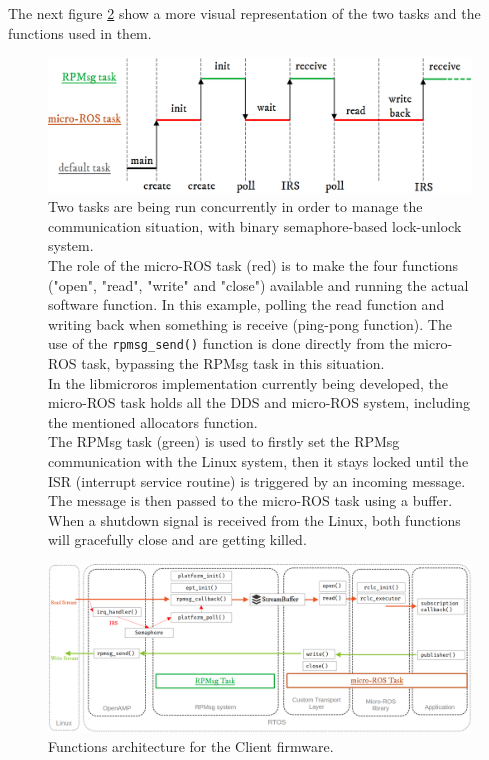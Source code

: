 \documentclass[10pt]{article}
\begin{document}
The next figure \ref{fig:org9400d2f} show a more visual representation of the two tasks and the
functions used in them.

\begin{figure}[htbp]
\centering
\includegraphics[width=.9\textwidth]{./img/tasks.png}
\caption{\label{fig:org5972a4b}Two tasks are being run concurrently in order to manage the communication situation, with binary semaphore-based lock-unlock system.\\[0pt]
 The role of the micro-ROS task (red) is to make the four functions ("open", "read", "write" and "close")  available and running the actual software function. In this example, polling the read function and writing back when something is receive (ping-pong function). The use of the \texttt{rpmsg\_send()} function is done directly from the micro-ROS task, bypassing the RPMsg task in this situation.\\[0pt]
 In the libmicroros implementation currently being developed, the micro-ROS task holds all the DDS and micro-ROS system, including the mentioned allocators function.\\[0pt]
 The RPMsg task (green) is used to firstly set the RPMsg communication with the Linux system, then it stays locked until the ISR (interrupt service routine) is triggered by an incoming message. The message is then passed to the micro-ROS task using a buffer.\\[0pt]
 When a shutdown signal is received from the Linux, both functions will gracefully close and are getting killed.}
\end{figure}

\begin{figure}[htbp]
\centering
\includegraphics[width=.9\textwidth]{./img/client_arch.png}
\caption{\label{fig:org9400d2f}Functions architecture for the Client firmware.}
\end{figure}
\end{document}
